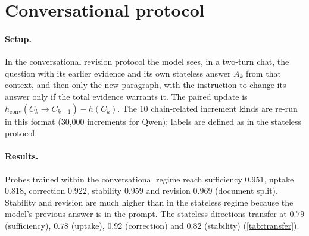 \section{Conversational protocol}
\label{app:conversational}
\paragraph{Setup.} In the conversational revision protocol the model sees, in a two-turn chat, the question with its earlier evidence and its own stateless answer $A_k$ from that context, and then only the new paragraph, with the instruction to change its answer only if the total evidence warrants it. The paired update is $h_{\text{conv}}(C_k\to C_{k+1})-h(C_k)$. The 10 chain-related increment kinds are re-run in this format (30{,}000 increments for Qwen); labels are defined as in the stateless protocol.

\paragraph{Results.} Probes trained within the conversational regime reach sufficiency $0.951$, uptake $0.818$, correction $0.922$, stability $0.959$ and revision $0.969$ (document split). Stability and revision are much higher than in the stateless regime because the model's previous answer is in the prompt. The stateless directions transfer at $0.79$ (sufficiency), $0.78$ (uptake), $0.92$ (correction) and $0.82$ (stability) (\cref{tab:transfer}).
